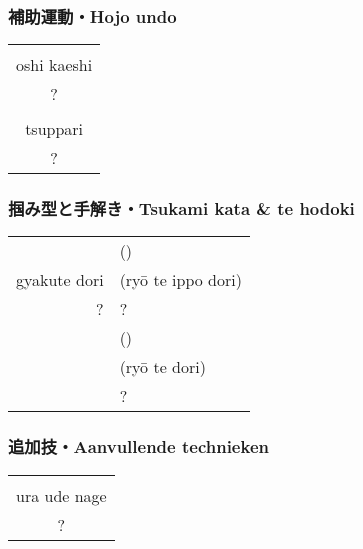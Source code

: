 \subsubsection{補助運動・Hojo undo}
\begin{table}[H]
\begin{center}
\begin{tabular}{c}
    \ruby{}{}\ruby{}{}\\
    oshi kaeshi\\
    ?\\
    \hline
    \ruby{}{}\\
    tsuppari\\
    ?
\end{tabular}
\end{center}
\label{kyuu_5_hojo_undo}
\end{table}

\subsubsection{掴み型と手解き・Tsukami kata \& te hodoki}
\begin{table}[H]
\begin{center}
\begin{tabular}{rl}
    \ruby{}{}\ruby{}{} & (\ruby{}{})\\
    gyakute dori & (ry\={o} te ippo dori)\\
    ? & ?\\
    \hline
    & (\ruby{}{})\\
    & (ry\={o} te dori)\\
    & ?
\end{tabular}
\end{center}
\label{kyuu_5_te_hodoki}
\end{table}

\subsubsection{追加技・Aanvullende technieken}
\begin{table}[H]
\begin{center}
\begin{tabular}{c}
    \ruby{}{}\ruby{}{}\\
    ura ude nage\\
    ?
\end{tabular}
\end{center}
\label{kyuu_5_additional}
\end{table}


